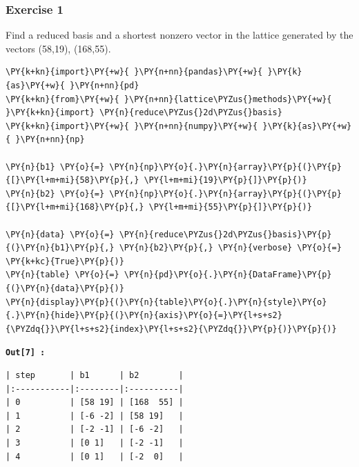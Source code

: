 \documentclass[a4paper,12pt]{article}
\begin{document}
\subsubsection{Exercise 1}\label{exercise-1}

Find a reduced basis and a shortest nonzero vector in the lattice
generated by the vectors (58,19), (168,55).

    \begin{tcolorbox}[breakable, size=fbox, boxrule=1pt, pad at break*=1mm,colback=cellbackground, colframe=cellborder]
\begin{Verbatim}[commandchars=\\\{\}]
\PY{k+kn}{import}\PY{+w}{ }\PY{n+nn}{pandas}\PY{+w}{ }\PY{k}{as}\PY{+w}{ }\PY{n+nn}{pd}
\PY{k+kn}{from}\PY{+w}{ }\PY{n+nn}{lattice\PYZus{}methods}\PY{+w}{ }\PY{k+kn}{import} \PY{n}{reduce\PYZus{}2d\PYZus{}basis}
\PY{k+kn}{import}\PY{+w}{ }\PY{n+nn}{numpy}\PY{+w}{ }\PY{k}{as}\PY{+w}{ }\PY{n+nn}{np}

\PY{n}{b1} \PY{o}{=} \PY{n}{np}\PY{o}{.}\PY{n}{array}\PY{p}{(}\PY{p}{[}\PY{l+m+mi}{58}\PY{p}{,} \PY{l+m+mi}{19}\PY{p}{]}\PY{p}{)}
\PY{n}{b2} \PY{o}{=} \PY{n}{np}\PY{o}{.}\PY{n}{array}\PY{p}{(}\PY{p}{[}\PY{l+m+mi}{168}\PY{p}{,} \PY{l+m+mi}{55}\PY{p}{]}\PY{p}{)}

\PY{n}{data} \PY{o}{=} \PY{n}{reduce\PYZus{}2d\PYZus{}basis}\PY{p}{(}\PY{n}{b1}\PY{p}{,} \PY{n}{b2}\PY{p}{,} \PY{n}{verbose} \PY{o}{=} \PY{k+kc}{True}\PY{p}{)}
\PY{n}{table} \PY{o}{=} \PY{n}{pd}\PY{o}{.}\PY{n}{DataFrame}\PY{p}{(}\PY{n}{data}\PY{p}{)}
\PY{n}{display}\PY{p}{(}\PY{n}{table}\PY{o}{.}\PY{n}{style}\PY{o}{.}\PY{n}{hide}\PY{p}{(}\PY{n}{axis}\PY{o}{=}\PY{l+s+s2}{\PYZdq{}}\PY{l+s+s2}{index}\PY{l+s+s2}{\PYZdq{}}\PY{p}{)}\PY{p}{)}
\end{Verbatim}
\end{tcolorbox}

    \begin{tcolorbox}[colback=white, colframe=gray!60, boxrule=0.5pt]
\texttt{\textbf{Out[7] :}}
     \begin{Verbatim}[commandchars=\\\{\}]
| step       | b1      | b2        |
|:-----------|:--------|:----------|
| 0          | [58 19] | [168  55] |
| 1          | [-6 -2] | [58 19]   |
| 2          | [-2 -1] | [-6 -2]   |
| 3          | [0 1]   | [-2 -1]   |
| 4          | [0 1]   | [-2  0]   |
    \end{Verbatim}
    \end{tcolorbox}
\end{document}
